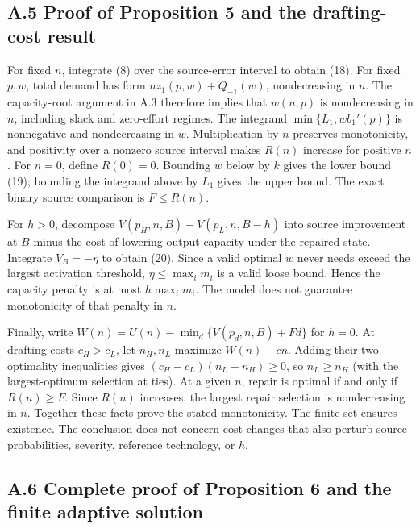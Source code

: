 \documentclass[
  11pt,
  a4paper,
]{article}
\begin{document}
\hypertarget{a.5-proof-of-proposition-5-and-the-drafting-cost-result}{%
\subsection{A.5 Proof of Proposition 5 and the drafting-cost
result}\label{a.5-proof-of-proposition-5-and-the-drafting-cost-result}}

For fixed \(n\), integrate (8) over the source-error interval to obtain
(18). For fixed \(p,w\), total demand has form \(n z_1(p,w)+Q_{-1}(w)\),
nondecreasing in \(n\). The capacity-root argument in A.3 therefore
implies that \(w(n,p)\) is nondecreasing in \(n\), including slack and
zero-effort regimes. The integrand \(\min\{L_1,w b_1'(p)\}\) is
nonnegative and nondecreasing in \(w\). Multiplication by \(n\)
preserves monotonicity, and positivity over a nonzero source interval
makes \(R(n)\) increase for positive \(n\). For \(n=0\), define
\(R(0)=0\). Bounding \(w\) below by \(k\) gives the lower bound (19);
bounding the integrand above by \(L_1\) gives the upper bound. The exact
binary source comparison is \(F\leq R(n)\).

For \(h>0\), decompose \(V(p_H,n,B)-V(p_L,n,B-h)\) into source
improvement at \(B\) minus the cost of lowering output capacity under
the repaired state. Integrate \(V_B=-\eta\) to obtain (20). Since a
valid optimal \(w\) never needs exceed the largest activation threshold,
\(\eta\leq\max_i m_i\) is a valid loose bound. Hence the capacity
penalty is at most \(h\max_i m_i\). The model does not guarantee
monotonicity of that penalty in \(n\).

Finally, write \(W(n)=U(n)-\min_d\{V(p_d,n,B)+Fd\}\) for \(h=0\). At
drafting costs \(c_H>c_L\), let \(n_H,n_L\) maximize \(W(n)-cn\). Adding
their two optimality inequalities gives \((c_H-c_L)(n_L-n_H)\geq0\), so
\(n_L\geq n_H\) (with the largest-optimum selection at ties). At a given
\(n\), repair is optimal if and only if \(R(n)\geq F\). Since \(R(n)\)
increases, the largest repair selection is nondecreasing in \(n\).
Together these facts prove the stated monotonicity. The finite set
ensures existence. The conclusion does not concern cost changes that
also perturb source probabilities, severity, reference technology, or
\(h\).

\hypertarget{a.6-complete-proof-of-proposition-6-and-the-finite-adaptive-solution}{%
\subsection{A.6 Complete proof of Proposition 6 and the finite adaptive
solution}\label{a.6-complete-proof-of-proposition-6-and-the-finite-adaptive-solution}}
\end{document}
